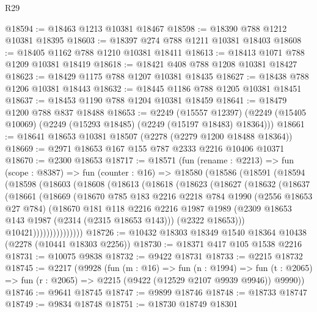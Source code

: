 \begin{lexlean}{R29}
\begin{coremodule}
@18594 := @18463 @1213 @10381 @18467
@18598 := @18390 @788 @1212 @10381 @18395
@18603 := @18397 @274 @788 @1211 @10381 @18403
@18608 := @18405 @1162 @788 @1210 @10381 @18411
@18613 := @18413 @1071 @788 @1209 @10381 @18419
@18618 := @18421 @408 @788 @1208 @10381 @18427
@18623 := @18429 @1175 @788 @1207 @10381 @18435
@18627 := @18438 @788 @1206 @10381 @18443
@18632 := @18445 @1186 @788 @1205 @10381 @18451
@18637 := @18453 @1190 @788 @1204 @10381 @18459
@18641 := @18479 @1200 @788 @837 @18488
@18653 := @2249
    (@15557 @12397)
    (@2249 (@15405 @10069) (@2249 (@15293 @18485) (@2249 (@15197 @18483) @18364)))
@18661 := @18641 @18653 @10381 @18507 (@2278 (@2279 @1200 @18488 @18364))
@18669 := @2971 @18653 @167 @155 @787 @2333 @2216 @10406 @10371
@18670 := @2300 @18653
@18717 := @18571
    (fun (rename : @2213) =>
    fun (scope : @8387) =>
    fun (counter : @16) =>
    @18580
      (@18586
        (@18591
          (@18594
            (@18598
              (@18603
                (@18608
                  (@18613
                    (@18618
                      (@18623
                        (@18627
                          (@18632
                            (@18637
                              (@18661
                                (@18669
                                  (@18670
                                    @785
                                    @183
                                    @2216
                                    @2218
                                    @784
                                    @1990
                                    (@2556 @18653 @27 @784)
                                    (@18670
                                      @181
                                      @118
                                      @2216
                                      @2216
                                      @1987
                                      @1989
                                      (@2309 @18653 @143 @1987 (@2314 (@2315 @18653 @143)))
                                      (@2322 @18653)))
                                  @10421)))))))))))))))
@18726 := @10432 @18303 @18349 @1540 @18364 @10438 (@2278 (@10441 @18303 @2256))
@18730 := @18371 @417 @105 @1538 @2216
@18731 := @10075 @9838
@18732 := @9422 @18731
@18733 := @2215 @18732
@18745 := @2217
    (@9928
      (fun (m : @16) =>
      fun (n : @1994) =>
      fun (t : @2065) => fun (r : @2065) => @2215 (@9422 (@12529 @2107 @9939 @9946)) @9990))
@18746 := @9641 @18745
@18747 := @9899 @18746
@18748 := @18733 @18747
@18749 := @9834 @18748
@18751 := @18730 @18749 @18301

\end{coremodule}
\end{lexlean}
